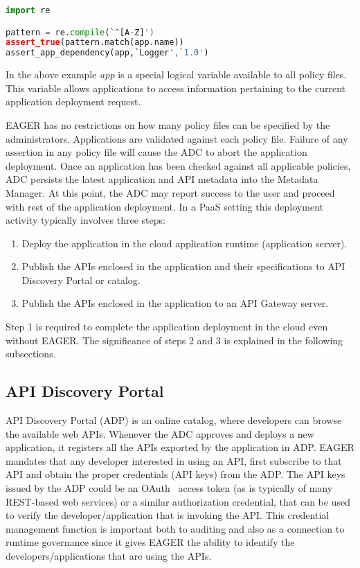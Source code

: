 {\footnotesize
\begin{lstlisting}[language=Python, frame=single]
import re

pattern = re.compile(`^[A-Z]')
assert_true(pattern.match(app.name))
assert_app_dependency(app,`Logger',`1.0')
\end{lstlisting}
}

In the above example \textit{app} is a special logical variable available to
all policy files. This variable allows applications to access information
pertaining to the current application deployment request. 

EAGER has no restrictions on how many policy files can be specified by the
administrators. Applications are validated against each policy file. Failure
of any assertion in any policy file will cause the ADC to abort the
application deployment. Once an application has been checked against all
applicable policies, ADC persists the latest application and API metadata into
the Metadata Manager.  At this point, the ADC may report success to the user
and proceed with rest of the application deployment. In a PaaS setting
this deployment
activity typically involves three
steps:

\begin{enumerate}
\item Deploy the application in the cloud application runtime (application server).
\item Publish the APIs enclosed in the application and their specifications to
API Discovery Portal or catalog.
\item Publish the APIs enclosed in the application to an API Gateway server.
\end{enumerate}

Step 1 is required to complete the application deployment in the cloud even without EAGER. The significance of steps 2 and 3 is explained in the 
following subsections.

\subsection{API Discovery Portal} API Discovery Portal (ADP) is an online
catalog, where developers can browse the available web APIs. Whenever the ADC
approves and deploys a new application, it registers all the APIs exported by
the application in ADP.  EAGER mandates that any developer interested in using
an API, first subscribe to that API and obtain the proper credentials (API
keys) from the ADP. The API keys issued by the ADP could be an
OAuth~\cite{oauth2} access
token (as is typically of many REST-based web services) 
or a similar authorization credential, that can be used to verify the
developer/application that is invoking the API. This credential management
function is
important both to auditing and also as a connection to
runtime governance since it gives EAGER the ability to identify
the developers/applications that are using the APIs. 

